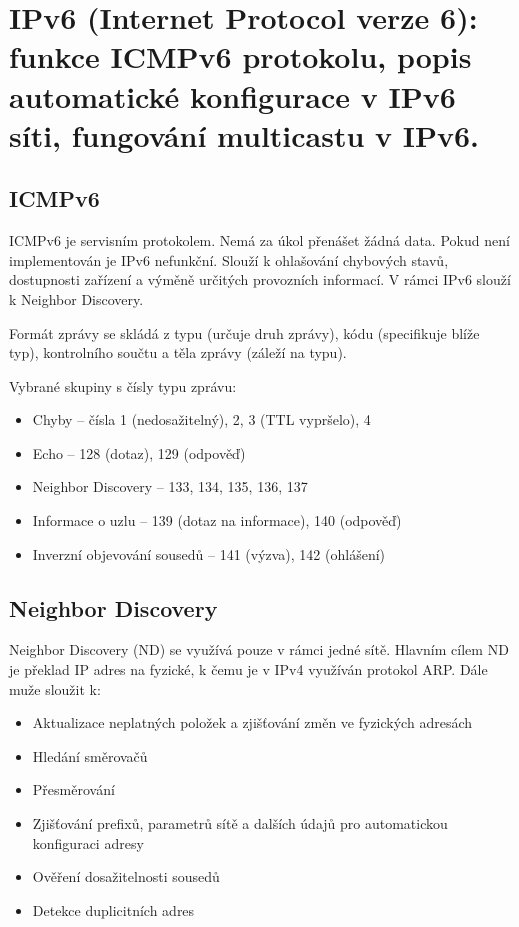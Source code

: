 \clearpage
\section{IPv6 (Internet Protocol verze 6): funkce ICMPv6 protokolu, popis automatické konfigurace v IPv6 síti, fungování multicastu v IPv6.}

\subsection{ICMPv6}

ICMPv6 je servisním protokolem.
Nemá za úkol přenášet žádná data.
Pokud není implementován je IPv6 nefunkční.
Slouží k ohlašování chybových stavů, dostupnosti zařízení a výměně určitých provozních informací.
V rámci IPv6 slouží k Neighbor Discovery.

Formát zprávy se skládá z typu (určuje druh zprávy), kódu (specifikuje blíže typ), kontrolního součtu a těla zprávy (záleží na typu).

Vybrané skupiny s čísly typu zprávu:
\begin{itemize}[noitemsep]
    \item Chyby -- čísla 1 (nedosažitelný), 2, 3 (TTL vypršelo), 4
    \item Echo -- 128 (dotaz), 129 (odpověď)
    \item Neighbor Discovery -- 133, 134, 135, 136, 137
    \item Informace o uzlu -- 139 (dotaz na informace), 140 (odpověď)
    \item Inverzní objevování sousedů -- 141 (výzva), 142 (ohlášení)
\end{itemize}

\subsection{Neighbor Discovery}

Neighbor Discovery (ND) se využívá pouze v rámci jedné sítě.
Hlavním cílem ND je překlad IP adres na fyzické, k čemu je v IPv4 využíván protokol ARP.
Dále muže sloužit k:
\begin{itemize}[noitemsep]
    \item Aktualizace neplatných položek a zjišťování změn ve fyzických adresách
    \item Hledání směrovačů
    \item Přesměrování
    \item Zjišťování prefixů, parametrů sítě a dalších údajů pro automatickou konfiguraci adresy
    \item Ověření dosažitelnosti sousedů
    \item Detekce duplicitních adres
\end{itemize}

